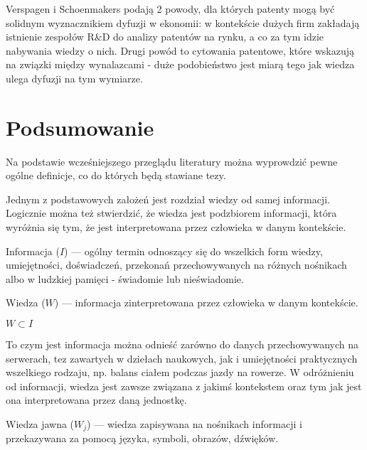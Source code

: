 Verspagen i Schoenmakers \cite{Ve-Sc-00} podają 2 powody, dla których
patenty mogą być solidnym wyznacznikiem dyfuzji w ekonomii:
w kontekście dużych firm zakładają istnienie zespołów R\&D do
analizy patentów na rynku, a co za tym idzie nabywania wiedzy
o nich. Drugi powód to cytowania patentowe, które wskazują
na związki między wynalazcami - duże podobieństwo jest miarą
tego jak wiedza ulega dyfuzji na tym wymiarze.


\section{Podsumowanie}

Na podstawie wcześniejszego przeglądu literatury można wyprowdzić
pewne ogólne definicje, co do których będą stawiane tezy.

Jednym z podstawowych założeń jest rozdział wiedzy od samej informacji.
Logicznie można też stwierdzić, że wiedza jest podzbiorem informacji,
która wyróżnia się tym, że jest interpretowana przez człowieka w danym
kontekście.

\begin{defi}
Informacja ($I$) --- ogólny termin odnoszący się do wszelkich form wiedzy, 
umiejętności, doświadczeń, przekonań przechowywanych na różnych nośnikach 
albo w ludzkiej pamięci - świadomie lub nieświadomie.
\end{defi}

\begin{defi}
Wiedza ($W$) --- informacja zinterpretowana przez człowieka w danym kontekście.
\begin{center}
\begin{math}
W \subset I
\end{math}
\end{center}
\end{defi}

To czym jest informacja można odnieść zarówno do danych
przechowywanych na serwerach, tez zawartych w dziełach naukowych,
jak i umiejętności praktycznych wszelkiego rodzaju, np.
balans ciałem podczas jazdy na rowerze. W odróżnieniu od informacji, 
wiedza jest zawsze związana z jakimś kontekstem oraz tym 
jak jest ona interpretowana przez daną jednostkę.

\begin{defi}
Wiedza jawna ($W_j$)  --- wiedza
zapisywana na nośnikach informacji i przekazywana za pomocą
języka, symboli, obrazów, dźwięków.
\end{defi}

